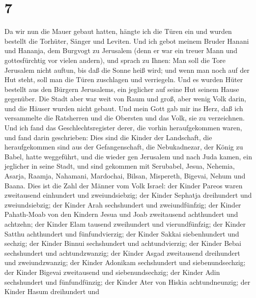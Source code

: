 \hypertarget{section-6}{%
\section{7}\label{section-6}}

 Da wir nun die Mauer gebaut hatten, hängte ich die Türen
ein und wurden bestellt die Torhüter, Sänger und Leviten. 
Und ich gebot meinem Bruder Hanani und Hananja, dem Burgvogt zu
Jerusalem (denn er war ein treuer Mann und gottesfürchtig vor vielen
andern),  und sprach zu Ihnen: Man soll die Tore Jerusalem
nicht auftun, bis daß die Sonne heiß wird; und wenn man noch auf der Hut
steht, soll man die Türen zuschlagen und verriegeln. Und es wurden Hüter
bestellt aus den Bürgern Jerusalems, ein jeglicher auf seine Hut seinem
Hause gegenüber.  Die Stadt aber war weit von Raum und groß,
aber wenig Volk darin, und die Häuser wurden nicht gebaut. 
Und mein Gott gab mir ins Herz, daß ich versammelte die Ratsherren und
die Obersten und das Volk, sie zu verzeichnen. Und ich fand das
Geschlechtsregister derer, die vorhin heraufgekommen waren, und fand
darin geschrieben:  Dies sind die Kinder der Landschaft, die
heraufgekommen sind aus der Gefangenschaft, die Nebukadnezar, der König
zu Babel, hatte weggeführt, und die wieder gen Jerusalem und nach Juda
kamen, ein jeglicher in seine Stadt,  und sind gekommen mit
Serubabel, Jesua, Nehemia, Asarja, Raamja, Nahamani, Mardochai, Bilsan,
Mispereth, Bigevai, Nehum und Baana. Dies ist die Zahl der Männer vom
Volk Israel:  der Kinder Pareos waren zweitausend einhundert
und zweiundsiebzig;  der Kinder Sephatja dreihundert und
zweiundsiebzig;  der Kinder Arah sechshundert und
zweiundfünfzig;  der Kinder Pahath-Moab von den Kindern
Jesua und Joab zweitausend achthundert und achtzehn;  der
Kinder Elam tausend zweihundert und vierundfünfzig;  der
Kinder Satthu achthundert und fünfundvierzig;  der Kinder
Sakkai siebenhundert und sechzig;  der Kinder Binnui
sechshundert und achtundvierzig;  der Kinder Bebai
sechshundert und achtundzwanzig;  der Kinder Asgad
zweitausend dreihundert und zweiundzwanzig;  der Kinder
Adonikam sechshundert und siebenundsechzig;  der Kinder
Bigevai zweitausend und siebenundsechzig;  der Kinder Adin
sechshundert und fünfundfünzig;  der Kinder Ater von Hiskia
achtundneunzig;  der Kinder Hasum dreihundert und
